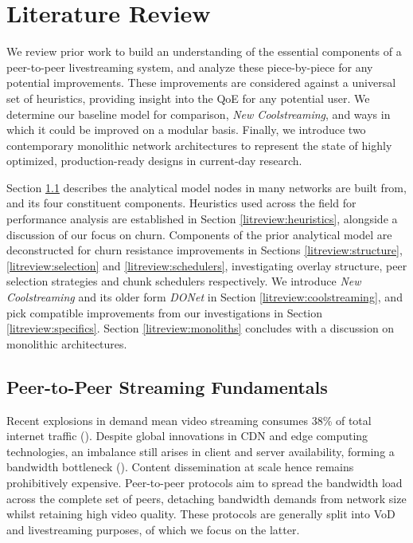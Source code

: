 \documentclass[12pt,a4paper]{article}
\begin{document}
\section{Literature Review}  \label{litreview}
We review prior work to build an understanding of the essential components of a peer-to-peer livestreaming system, and analyze these piece-by-piece for any potential improvements. These improvements are considered against a universal set of heuristics, providing insight into the QoE for any potential user. We determine our baseline model for comparison, \textit{New Coolstreaming}, and ways in which it could be improved on a modular basis. Finally, we introduce two contemporary monolithic network architectures to represent the state of highly optimized, production-ready designs in current-day research.

Section \ref{litreview:fundamentals} describes the analytical model nodes in many networks are built from, and its four constituent components. Heuristics used across the field for performance analysis are established in Section \ref{litreview:heuristics}, alongside a discussion of our focus on churn. Components of the prior analytical model are deconstructed for churn resistance improvements in Sections \ref{litreview:structure}, \ref{litreview:selection} and \ref{litreview:schedulers}, investigating overlay structure, peer selection strategies and chunk schedulers respectively. We introduce \textit{New Coolstreaming} and its older form \textit{DONet} in Section \ref{litreview:coolstreaming}, and pick compatible improvements from our investigations in Section \ref{litreview:specifics}. Section \ref{litreview:monoliths} concludes with a discussion on monolithic architectures.

\subsection{Peer-to-Peer Streaming Fundamentals} \label{litreview:fundamentals}
Recent explosions in demand mean video streaming consumes 38\% of total internet traffic (\cite{Sandvine2024}). Despite global innovations in CDN and edge computing technologies, an imbalance still arises in client and server availability, forming a bandwidth bottleneck (\cite{Ramzan2012}). Content dissemination at scale hence remains prohibitively expensive. Peer-to-peer protocols aim to spread the bandwidth load across the complete set of peers, detaching bandwidth demands from network size whilst retaining high video quality. These protocols are generally split into VoD and livestreaming purposes, of which we focus on the latter.
\end{document}
